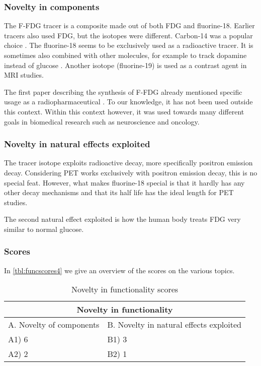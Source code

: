 \subsubsection{Novelty in components}
The F-FDG tracer is a composite made out of both FDG and fluorine-18. Earlier
tracers also used FDG, but the isotopes were different. Carbon-14 was a popular
choice \cite{radiopharma}. The fluorine-18 seems to be exclusively used as a
radioactive tracer. It is sometimes also combined with other molecules, for
example to track dopamine instead of glucose \cite{fluorodopa, fdopamine}.
Another isotope (fluorine-19) is used as a contrast agent in MRI studies.

The first paper describing the synthesis of F-FDG already mentioned specific
usage as a radiopharmaceutical \cite{firstF-FDG}. To our knowledge, it has not
been used outside this context. Within this context however, it was used towards
many different goals in biomedical research such as neuroscience and oncology. 

\subsubsection{Novelty in natural effects exploited}
The tracer isotope exploits radioactive decay, more specifically positron
emission decay. Considering PET works exclusively with positron emission decay,
this is no special feat. However, what makes fluorine-18 special is that it
hardly has any other decay mechanisms and that its half life has the ideal
length for PET studies.

The second natural effect exploited is how the human body treats FDG very
similar to normal glucose.

\subsubsection{Scores}
In \autoref{tbl:funcscores4} we give an overview of the scores on the various
topics.

\begin{table}[h]
\centering
\begin{tabular}{l l}
\hline
\multicolumn{2}{|c|}{Novelty in functionality} \\
\hline
A. Novelty of components & B. Novelty in natural effects exploited\\
A1) 6 & B1) 3\\ 
A2) 2 & B2) 1\\ 
\hline
\end{tabular}
\caption{Novelty in functionality scores}
\label{tbl:funcscores4}
\end{table}

